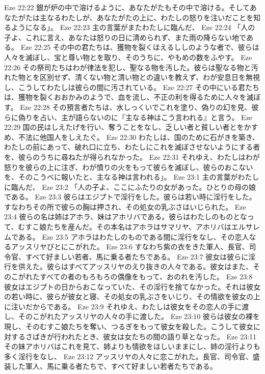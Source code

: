 Eze 22:22  銀が炉の中で溶けるように、あなたがたもその中で溶ける。そしてあなたがたは主なるわたしが、あなたがたの上に、わたしの怒りを注いだことを知るようになる」。
Eze 22:23  主の言葉がまたわたしに臨んだ、
Eze 22:24  「人の子よ、これに言え、あなたは怒りの日に清められず、また雨の降らない地である。
Eze 22:25  その中の君たちは、獲物を裂くほえるししのような者で、彼らは人々を滅ぼし、宝と尊い物とを取り、そのうちに、やもめの数をふやす。
Eze 22:26  その祭司たちはわが律法を犯し、聖なる物を汚した。彼らは聖なる物と汚れた物とを区別せず、清くない物と清い物との違いを教えず、わが安息日を無視し、こうしてわたしは彼らの間に汚されている。
Eze 22:27  その中にいる君たちは、獲物を裂くおおかみのようで、血を流し、不正の利を得るために人々を滅ぼす。
Eze 22:28  その預言者たちは、水しっくいでこれを塗り、偽りの幻を見、彼らに偽りを占い、主が語らないのに『主なる神はこう言われる』と言う。
Eze 22:29  国の民はしえたげを行い、奪うことをなし、乏しい者と貧しい者とをかすめ、不法に他国人をしえたぐ。
Eze 22:30  わたしは、国のために石がきを築き、わたしの前にあって、破れ口に立ち、わたしにこれを滅ぼさせないようにする者を、彼らのうちに尋ねたが得られなかった。
Eze 22:31  それゆえ、わたしはわが怒りを彼らの上に注ぎ、わが憤りの火をもって彼らを滅ぼし、彼らのおこないを、そのこうべに報いたと、主なる神は言われる」。
Eze 23:1  主の言葉がわたしに臨んだ、
Eze 23:2  「人の子よ、ここにふたりの女があった。ひとりの母の娘である。
Eze 23:3  彼らはエジプトで淫行をした。彼らは若い時に淫行をした。すなわちその所で彼らの胸は押され、その処女の乳ぶさはいじられた。
Eze 23:4  彼らの名は姉はアホラ、妹はアホリバである。彼らはわたしのものとなって、むすこ娘たちを産んだ。その本名はアホラはサマリヤ、アホリバはエルサレムである。
Eze 23:5  アホラはわたしのものである間に淫行をなし、その恋人なるアッスリヤびとにこがれた。
Eze 23:6  すなわち紫の衣をきた軍人、長官、司令官、すべて好ましい若者、馬に乗る者たちである。
Eze 23:7  彼女は彼らに淫行を供えた。彼らはすべてアッスリヤのえり抜きの人々である。彼女はまた、そのこがれたすべての者のもろもろの偶像をもって、おのれを汚した。
Eze 23:8  彼女はエジプトの日からおこなっていた、その淫行を捨てなかった。それは彼女の若い時に、彼らが彼女と寝、その処女の乳ぶさをいじり、その情欲を彼女の上に注いだからである。
Eze 23:9  それゆえ、わたしは彼女をその恋人の手に渡し、そのこがれたアッスリヤの人々の手に渡した。
Eze 23:10  彼らは彼女の裸を現し、そのむすこ娘たちを奪い、つるぎをもって彼女を殺した。こうして彼女に対するさばきが行われたとき、彼女は女たちの間の語り草となった。
Eze 23:11  その妹アホリバはこれを見て、姉よりも情欲をほしいままにし、姉の淫行よりも多く淫行をなし、
Eze 23:12  アッスリヤの人々に恋こがれた。長官、司令官、盛装した軍人、馬に乗る者たちで、すべて好ましい若者たちである。
